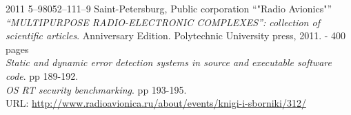 
\begin{entrylist}
    \entry
    {2011}
    {5–98052–111–9}
    {Saint-Petersburg, Public corporation \enquote{"Radio Avionics"}}
    {\textit{\enquote{MULTIPURPOSE RADIO-ELECTRONIC COMPLEXES}: collection of scientific articles}. Anniversary Edition. Polytechnic University press, 2011. - 400 pages \\
    \textit{Static and dynamic error detection systems in source and executable software code}. pp 189-192. \\
    \textit{OS RT security benchmarking}. pp 193-195.\\
    URL: \url{http://www.radioavionica.ru/about/events/knigi-i-sborniki/312/}
    }
\end{entrylist}
